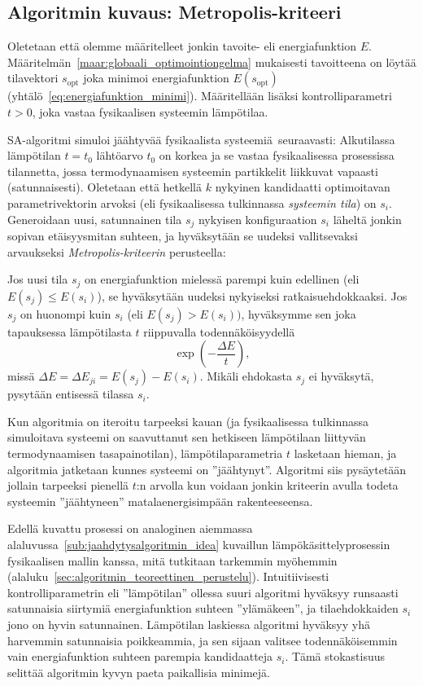 \subsection{Algoritmin kuvaus: Metropolis-kriteeri}
\label{sub:algoritmin_kuvaus_metropolis_kriteeri}

Oletetaan että olemme määritelleet jonkin tavoite- eli energiafunktion $E$.
Määritelmän~\ref{maar:globaali_optimointiongelma} mukaisesti
tavoitteena on löytää tilavektori $s_\text{opt}$ joka minimoi energiafunktion $E(s_\text{opt})$ (yhtälö~\ref{eq:energiafunktion_minimi}).
Määritellään lisäksi kontrolliparametri $t > 0$,
joka vastaa fysikaalisen systeemin lämpötilaa.

SA-algoritmi simuloi jäähtyvää fysikaalista systeemiä seuraavasti:
Alkutilassa lämpötilan $t = t_0$ lähtöarvo $t_0$ on korkea ja se vastaa fysikaalisessa prosessissa tilannetta, jossa termodynaamisen systeemin partikkelit liikkuvat vapaasti (satunnaisesti).
Oletetaan että hetkellä $k$ nykyinen kandidaatti optimoitavan parametrivektorin arvoksi (eli fysikaalisessa tulkinnassa \emph{systeemin tila}) on $s_i$.
Generoidaan uusi, satunnainen tila $s_j$ nykyisen konfiguraation $s_i$ läheltä jonkin sopivan etäisyysmitan suhteen,
ja hyväksytään se uudeksi vallitsevaksi arvaukseksi \emph{Metropolis-kriteerin} perusteella:

Jos uusi tila $s_j$ on energiafunktion mielessä parempi kuin edellinen (eli $E(s_j) \leq E(s_i)$), se hyväksytään uudeksi nykyiseksi ratkaisuehdokkaaksi.
Jos $s_j$ on huonompi kuin $s_i$ (eli $E(s_j) > E(s_i))$, hyväksymme sen joka tapauksessa lämpötilasta $t$ riippuvalla todennäköisyydellä
\begin{equation}
    \exp\left(-\frac{\Delta E}{t}\right),
\end{equation}
missä $\Delta E = \Delta E_{ji} = E(s_j) - E(s_i)$.
Mikäli ehdokasta $s_j$ ei hyväksytä, pysytään entisessä tilassa $s_i$.

Kun algoritmia on iteroitu tarpeeksi kauan (ja fysikaalisessa tulkinnassa simuloitava systeemi on saavuttanut sen hetkiseen lämpötilaan liittyvän termodynaamisen tasapainotilan), lämpötilaparametria $t$ lasketaan hieman, ja algoritmia jatketaan kunnes systeemi on ''jäähtynyt''.
Algoritmi siis pysäytetään jollain tarpeeksi pienellä $t$:n arvolla kun voidaan jonkin kriteerin avulla todeta systeemin ''jäähtyneen'' matalaenergisimpään rakenteeseensa.

Edellä kuvattu prosessi on analoginen aiemmassa alaluvussa~\ref{sub:jaahdytysalgoritmin_idea} kuvaillun lämpökäsittelyprosessin fysikaalisen mallin kanssa,
mitä tutkitaan tarkemmin myöhemmin (alaluku~\ref{sec:algoritmin_teoreettinen_perustelu}).
Intuitiivisesti kontrolliparametrin eli ''lämpötilan'' ollessa suuri algoritmi hyväksyy runsaasti satunnaisia siirtymiä energiafunktion suhteen ''ylämäkeen'', ja tilaehdokkaiden $s_i$ jono on hyvin satunnainen.
Lämpötilan laskiessa algoritmi hyväksyy yhä harvemmin satunnaisia poikkeammia, ja sen sijaan valitsee todennäköisemmin vain energiafunktion suhteen parempia kandidaatteja $s_i$.
Tämä stokastisuus selittää algoritmin kyvyn paeta paikallisia minimejä.

